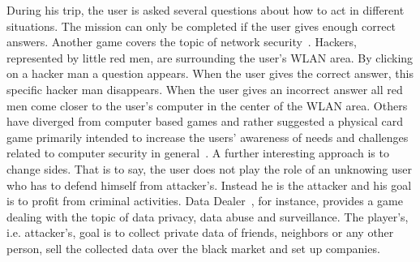 During his trip, the user is asked several questions about how to act in different situations. 
The mission can only be completed if the user gives enough correct answers.
Another game covers the topic of network security~\cite{wirelesshackers}. 
Hackers, represented by little red men, are surrounding the user's WLAN area. 
By clicking on a hacker man a question appears. 
When the user gives the correct answer, this specific hacker man disappears. 
When the user gives an incorrect answer all red men come closer to the user's computer in the center of the WLAN area.
Others have diverged from computer based games and rather suggested a physical card game primarily intended to increase the users' awareness of needs and challenges related to computer security in general~\cite{denning2013controlalthack}.
A further interesting approach is to change sides.
That is to say, the user does not play the role of an unknowing user who has to defend himself from attacker's.
Instead he is the attacker and his goal is to profit from criminal activities.
Data Dealer~\cite{datadealer}, for instance, provides a game dealing with the topic of data privacy, data abuse and surveillance.
The player's, i.e. attacker's, goal is to collect private data of friends, neighbors or any other person, sell the collected data over the black market and set up companies.







 

